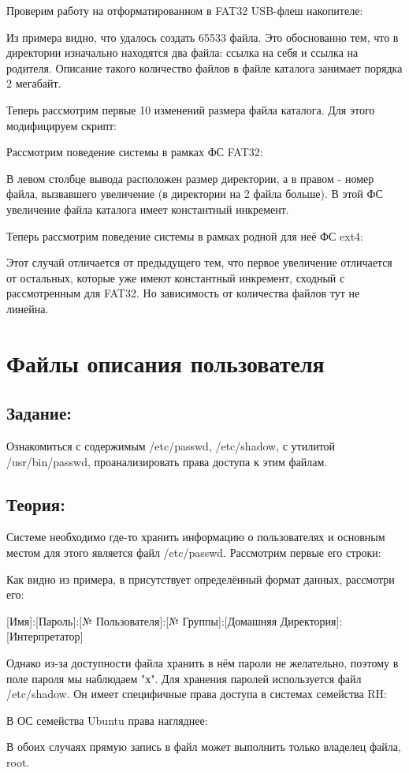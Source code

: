 \documentclass[a4paper]{article}
\begin{document}

Проверим работу на отформатированном в FAT32 USB-флеш накопителе:

Из примера видно, что удалось создать 65533 файла. Это обоснованно тем, что в директории изначально находятся два файла: ссылка на себя и ссылка на родителя. Описание такого количество файлов в файле каталога занимает порядка 2 мегабайт.


Теперь рассмотрим первые 10 изменений размера файла каталога. Для этого модифицируем скрипт:

Рассмотрим поведение системы в рамках ФС FAT32:

В левом столбце вывода расположен размер директории, а в правом - номер файла, вызвавшего увеличение (в директории на 2 файла больше). В этой ФС увеличение файла каталога имеет константный инкремент.

Теперь рассмотрим поведение системы в рамках родной для неё ФС ext4:

Этот случай отличается от предыдущего тем, что первое увеличение отличается от остальных, которые уже имеют константный инкремент, сходный с рассмотренным для FAT32. Но зависимость от количества файлов тут не линейна.
\section{Файлы описания пользователя} \subsection{Задание:} Ознакомиться с содержимым /etc/passwd, /etc/shadow, с утилитой /usr/bin/passwd, проанализировать права доступа к этим файлам.
\subsection{ Теория:}
Системе необходимо где-то хранить информацию о пользователях и основным местом для этого является файл /etc/passwd. Рассмотрим первые его строки:

Как видно из примера, в присутствует определённый формат данных, рассмотри его:

[Имя]:[Пароль]:[№ Пользователя]:[№ Группы]:[Домашняя Директория]:[Интерпретатор]

Однако из-за доступности файла хранить в нём пароли не желательно, поэтому в поле пароля мы наблюдаем "х". Для хранения паролей используется файл /etc/shadow. Он имеет специфичные права доступа в системах семейства RH:

В ОС семейства Ubuntu права нагляднее:

В обоих случаях прямую запись в файл может выполнить только владелец файла, root.
\end{document}
